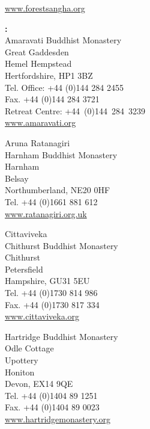 
\vspace*{-3\onelineskip}

{\centering
\addressesTitleSize

{\soChapter{\MakeUppercase{\branchMonasteries}}}

\href{http://www.forestsangha.org}{\textcolor{darkgold}{www.forestsangha.org}}
\vspace*{\baselineskip}

\hspace*{10mm}
\begin{minipage}{0.8\linewidth}
\begin{multicols}{2}
\setlength{\parindent}{0pt}
\setlength{\parskip}{0.7\baselineskip}
\addressesSize

{\raggedright

\textbf{\MakeUppercase{\textUnitedKingdom}:}\\
Amaravati Buddhist Monastery\\
Great Gaddesden\\
Hemel Hempstead\\
Hertfordshire, HP1 3BZ\\
Tel. Office: +44 (0)144 284 2455\\
Fax. +44 (0)144 284 3721\\
Retreat Centre: \mbox{+44 (0)144 284 3239}\\
\href{http://www.amaravati.org}{www.amaravati.org}

Aruna Ratanagiri\\
Harnham Buddhist Monastery\\
Harnham\\
Belsay\\
Northumberland, NE20 0HF\\
Tel. +44 (0)1661 881 612\\
\href{http://www.ratanagiri.org.uk}{www.ratanagiri.org.uk}

Cittaviveka\\
Chithurst Buddhist Monastery\\
Chithurst\\
Petersfield\\
Hampshire, GU31 5EU\\
Tel. +44 (0)1730 814 986\\
Fax. +44 (0)1730 817 334\\
\href{http://www.cittaviveka.org}{www.cittaviveka.org}

Hartridge Buddhist Monastery\\
Odle Cottage\\
Upottery\\
Honiton\\
Devon, EX14 9QE\\
Tel. +44 (0)1404 89 1251\\
Fax. +44 (0)1404 89 0023\\
\href{http://www.hartridgemonastery.org}{www.hartridgemonastery.org}

}
\end{multicols}
\end{minipage}}
